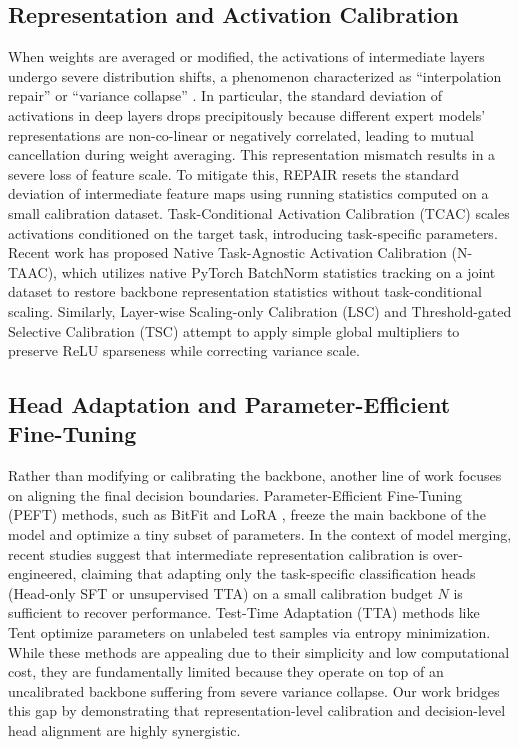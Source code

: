\documentclass{article}
\theoremstyle{plain}
\theoremstyle{definition}
\theoremstyle{remark}
\begin{document}
\subsection{Representation and Activation Calibration}
When weights are averaged or modified, the activations of intermediate layers undergo severe distribution shifts, a phenomenon characterized as ``interpolation repair'' or ``variance collapse'' \cite{jordan2022repair}. In particular, the standard deviation of activations in deep layers drops precipitously because different expert models' representations are non-co-linear or negatively correlated, leading to mutual cancellation during weight averaging. This representation mismatch results in a severe loss of feature scale. To mitigate this, REPAIR \cite{jordan2022repair} resets the standard deviation of intermediate feature maps using running statistics computed on a small calibration dataset. Task-Conditional Activation Calibration (TCAC) scales activations conditioned on the target task, introducing task-specific parameters. Recent work has proposed Native Task-Agnostic Activation Calibration (N-TAAC), which utilizes native PyTorch BatchNorm statistics tracking on a joint dataset to restore backbone representation statistics without task-conditional scaling. Similarly, Layer-wise Scaling-only Calibration (LSC) and Threshold-gated Selective Calibration (TSC) attempt to apply simple global multipliers to preserve ReLU sparseness while correcting variance scale.

\subsection{Head Adaptation and Parameter-Efficient Fine-Tuning}
Rather than modifying or calibrating the backbone, another line of work focuses on aligning the final decision boundaries. Parameter-Efficient Fine-Tuning (PEFT) methods, such as BitFit \cite{zaken2022bitfit} and LoRA \cite{hu2021lora}, freeze the main backbone of the model and optimize a tiny subset of parameters. In the context of model merging, recent studies \cite{zaken2022bitfit} suggest that intermediate representation calibration is over-engineered, claiming that adapting only the task-specific classification heads (Head-only SFT or unsupervised TTA) on a small calibration budget $N$ is sufficient to recover performance. Test-Time Adaptation (TTA) methods like Tent \cite{wang2021tent} optimize parameters on unlabeled test samples via entropy minimization. While these methods are appealing due to their simplicity and low computational cost, they are fundamentally limited because they operate on top of an uncalibrated backbone suffering from severe variance collapse. Our work bridges this gap by demonstrating that representation-level calibration and decision-level head alignment are highly synergistic.
\end{document}

